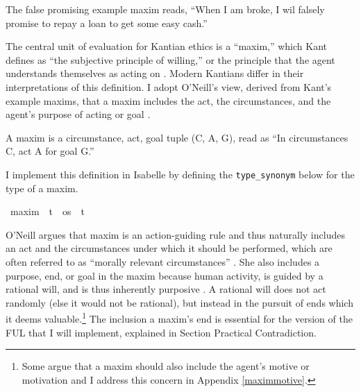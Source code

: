 \begin{isabellebody}
\begin{isamarkuptext}
\begin{example}\label{falsepromise}
  The false promising example maxim reads, ``When I am broke, I wil falsely promise to repay a loan 
to get some easy cash.''
\end{example}

The central unit of evaluation for Kantian ethics is a ``maxim,'' which Kant defines as ``the subjective 
principle of willing,'' or the principle that the agent understands themselves as acting on \citep{groundwork}. 
Modern Kantians differ in their interpretations of this definition. I adopt O'Neill's view, derived from 
Kant's example maxims, that a maxim includes the act, the circumstances, and the agent's purpose of 
acting or goal \citep{actingonprinciple}. 

\begin{definition}[Maxim]
    A maxim is a circumstance, act, goal tuple (C, A, G), read as ``In circumstances C, act A for goal G.''
\end{definition}

I implement this definition in Isabelle by defining the \texttt{type\_synonym} below for the type
of a maxim.%
\end{isamarkuptext}\isamarkuptrue%
\isamarkupfalse%
\ maxim\ {\isacharequal}\ {\isachardoublequoteopen}{\isacharparenleft}t\ {\isacharasterisk}\ os\ {\isacharasterisk}\ t{\isacharparenright}{\isachardoublequoteclose}\isanewline
%
%
\begin{isamarkuptext}%
O'Neill \cite[37]{actingonprinciple} argues that maxim 
is an action-guiding rule and thus naturally includes an act and the circumstances under which 
it should be performed, which are often referred to as ``morally relevant circumstances'' \citep[37]{actingonprinciple}. 
She also includes a purpose, end, or goal in the maxim because human activity, is guided by a rational will, 
and is thus inherently purposive \citep[4:428]{groundwork}. A rational will does not act randomly (else it would not be rational), 
but instead in the pursuit of ends which it deems valuable.\footnote{Some argue that a maxim should also
include the agent's motive or motivation and I address this concern in Appendix \ref{maximmotive}.} The inclusion a maxim's end is essential for the version of the FUL
that I will implement, explained in Section Practical Contradiction.


\end{isamarkuptext}
\end{isabellebody}
